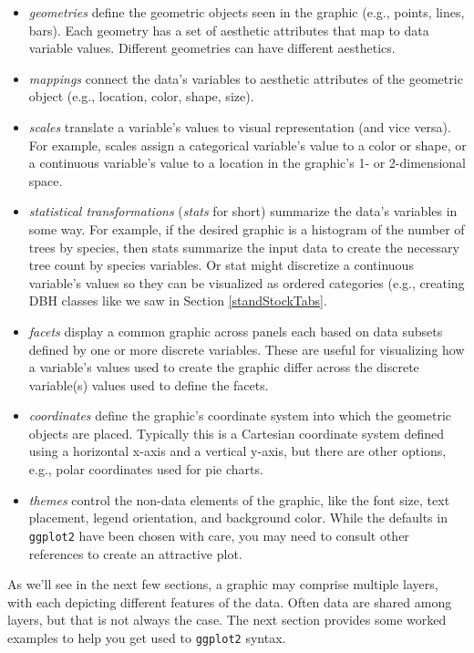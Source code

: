 \documentclass[
  11pt,
]{krantz}
\theoremstyle{definition}
\theoremstyle{definition}
\theoremstyle{definition}
\theoremstyle{definition}
\theoremstyle{remark}
\begin{document}
\begin{itemize}
\item
  \emph{geometries} define the geometric objects seen in the graphic (e.g., points, lines, bars). Each geometry has a set of aesthetic attributes that map to data variable values. Different geometries can have different aesthetics.
\item
  \emph{mappings} connect the data's variables to aesthetic attributes of the geometric object (e.g., location, color, shape, size).
\item
  \emph{scales} translate a variable's values to visual representation (and vice versa). For example, scales assign a categorical variable's value to a color or shape, or a continuous variable's value to a location in the graphic's 1- or 2-dimensional space.
\item
  \emph{statistical transformations} (\emph{stats} for short) summarize the data's variables in some way. For example, if the desired graphic is a histogram of the number of trees by species, then stats summarize the input data to create the necessary tree count by species variables. Or stat might discretize a continuous variable's values so they can be visualized as ordered categories (e.g., creating DBH classes like we saw in Section \ref{standStockTabs}.
\item
  \emph{facets} display a common graphic across panels each based on data subsets defined by one or more discrete variables. These are useful for visualizing how a variable's values used to create the graphic differ across the discrete variable(s) values used to define the facets.
\item
  \emph{coordinates} define the graphic's coordinate system into which the geometric objects are placed. Typically this is a Cartesian coordinate system defined using a horizontal x-axis and a vertical y-axis, but there are other options, e.g., polar coordinates used for pie charts.
\item
  \emph{themes} control the non-data elements of the graphic, like the font size, text placement, legend orientation, and background color. While the defaults in \texttt{ggplot2} have been chosen with care, you may need to consult other references to create an attractive plot.
\end{itemize}

As we'll see in the next few sections, a graphic may comprise multiple layers, with each depicting different features of the data. Often data are shared among layers, but that is not always the case. The next section provides some worked examples to help you get used to \texttt{ggplot2} syntax.
\end{document}
